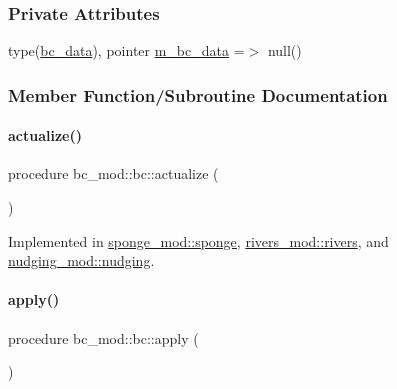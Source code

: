 \subsubsection*{Private Attributes}
\begin{DoxyCompactItemize}
\item 
type(\mbox{\hyperlink{structbc__data__mod_1_1bc__data}{bc\+\_\+data}}), pointer \mbox{\hyperlink{structbc__mod_1_1bc_a9ec09a6b6f5e1e75406505cb2851051a}{m\+\_\+bc\+\_\+data}} =$>$ null()
\end{DoxyCompactItemize}


\subsubsection{Member Function/\+Subroutine Documentation}
\mbox{\label{structbc__mod_1_1bc_a15503494f181d4090774d948cecdce48}} 
\paragraph{\texorpdfstring{actualize()}{actualize()}}
{\footnotesize\ttfamily procedure bc\+\_\+mod\+::bc\+::actualize (\begin{DoxyParamCaption}{ }\end{DoxyParamCaption})\hspace{0.3cm}{\ttfamily [private]}}



Implemented in \mbox{\hyperlink{structsponge__mod_1_1sponge_a7d01836ef5f2e2ea4ee11a6c6231baed}{sponge\+\_\+mod\+::sponge}}, \mbox{\hyperlink{structrivers__mod_1_1rivers_a7c1b4c7a383553f4cacdae90725f3249}{rivers\+\_\+mod\+::rivers}}, and \mbox{\hyperlink{structnudging__mod_1_1nudging_ade178a579111036782c7b4570018f0d5}{nudging\+\_\+mod\+::nudging}}.

\mbox{\label{structbc__mod_1_1bc_a628eafc79842d1d1d62e043aedf49aa0}} 
\paragraph{\texorpdfstring{apply()}{apply()}}
{\footnotesize\ttfamily procedure bc\+\_\+mod\+::bc\+::apply (\begin{DoxyParamCaption}{ }\end{DoxyParamCaption})\hspace{0.3cm}{\ttfamily [private]}}



